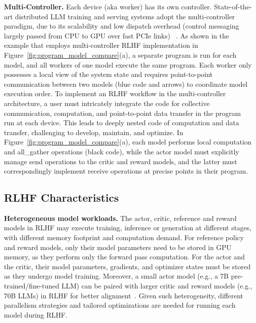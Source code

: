 \noindent \textbf{Multi-Controller.} %
Each device (aka worker) has its own controller. %
State-of-the-art distributed LLM training and serving systems adopt the multi-controller paradigm, due to its scalability and low dispatch overhead (control messaging largely passed from CPU to GPU over fast PCIe links) %
~\cite{shoeybi2019megatron, jiang2024megascale, rasley2020deepspeed, kwon2023efficient}.
As shown in the example that employs multi-controller RLHF implementation in Figure~\ref{fig:program_model_compare}(a), %
a separate program is run for each model, and all workers of one model execute the same program.
Each %
worker only possesses a local view of the system state and requires %
point-to-point communication between two models %
(blue code and arrows) to coordinate model execution order.
To implement an RLHF workflow in the multi-controller architecture, a user must intricately integrate the code for collective communication, computation, and point-to-point data transfer in the program run at each device.
This leads to deeply nested code of %
computation and data transfer, %
challenging to develop, maintain, and optimize. 
In Figure~\ref{fig:program_model_compare}(a), each model performs local computation and all\_gather operations (black code), while the actor model must explicitly manage send operations to the critic and reward models, and the latter must correspondingly implement receive operations at precise points in their program.






\vspace{-2mm}
\subsection{RLHF Characteristics} \label{sec:2_3_rlhf_characterisitc}





\noindent\textbf{Heterogeneous model workloads.} 
The actor, critic, reference and reward models in RLHF may %
execute training, inference or generation at different stages, with different %
memory footprint and computation demand.
For reference policy and reward models,  %
only their model parameters need to be stored in GPU memory, as they
perform only the forward pass computation.
For the actor and the critic, their model parameters, gradients, and optimizer states must be stored as they undergo model training. %
Moreover, a small actor model (e.g., a 7B pre-trained/fine-tuned LLM) can be paired with %
larger critic and reward models (e.g., 70B LLMs) in RLHF for better alignment~\cite{bai2022training}.
Given such heterogeneity, different parallelism strategies and tailored %
optimizations are needed for running each model during RLHF.


